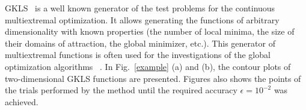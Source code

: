 \documentclass{llncs}
\begin{document}
GKLS~\cite{Gaviano} is a well known generator of the test problems for the continuous multiextremal 
optimization. It allows generating the functions of arbitrary dimensionality with 
known properties (the number of local minima, the size of their domains of attraction, the global 
minimizer, etc.).  
This generator of multiextremal functions is often used for the investigations of the global 
optimization algorithms ~\cite{Paulavicius2014,SergeyevKvasov2015,Lebedev2015,Gergel2015}. 
In Fig.~\ref{example} (a) and (b), the contour plots of two-dimensional GKLS functions are 
presented. Figures also shows the points of the trials performed by the method until the required 
accuracy $\epsilon=10^{-2}$ was achieved.

\begin{figure}
\begin{minipage}{0.5\linewidth}
\end{minipage}
\hfill
\begin{minipage}{0.5\linewidth}

\end{minipage}
\end{figure}
\end{document}
